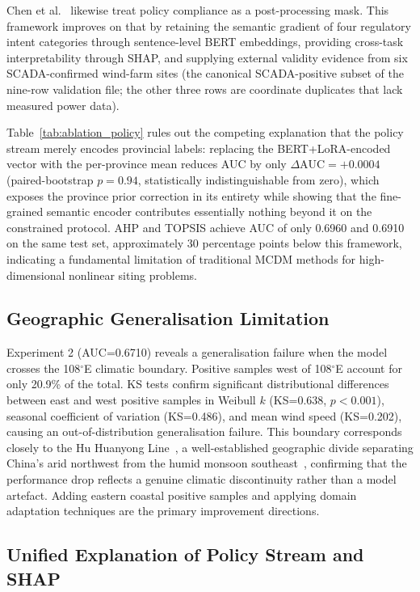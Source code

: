 \documentclass[12pt, a4paper]{article}
\begin{document}
Chen et al.~\cite{chen2026} likewise treat policy compliance
as a post-processing mask. This framework improves on that by
retaining the semantic gradient of four regulatory intent
categories through sentence-level BERT embeddings, providing
cross-task interpretability through SHAP, and supplying
external validity evidence from six SCADA-confirmed wind-farm
sites (the canonical SCADA-positive subset of the nine-row
validation file; the other three rows are coordinate
duplicates that lack measured power data).

Table~\ref{tab:ablation_policy} rules out the competing
explanation that the policy stream merely encodes provincial
labels: replacing the BERT+LoRA-encoded vector with the
per-province mean reduces AUC by only
$\Delta\text{AUC}=+0.0004$ (paired-bootstrap $p=0.94$,
statistically indistinguishable from zero), which exposes the
province prior correction in its entirety while showing that
the fine-grained semantic encoder contributes essentially
nothing beyond it on the constrained protocol. AHP and TOPSIS
achieve AUC of only 0.6960 and 0.6910 on the same test set,
approximately 30 percentage points below this framework,
indicating a fundamental limitation of traditional MCDM
methods for high-dimensional nonlinear siting problems.

\subsection{Geographic Generalisation Limitation}

Experiment 2 (AUC=0.6710) reveals a generalisation failure
when the model crosses the 108$^\circ$E climatic boundary.
Positive samples west of 108$^\circ$E account for only 20.9\%
of the total. KS tests confirm significant distributional
differences between east and west positive samples in Weibull
$k$ (KS=0.638, $p<0.001$), seasonal coefficient of variation
(KS=0.486), and mean wind speed (KS=0.202), causing an
out-of-distribution generalisation failure. This boundary
corresponds closely to the Hu Huanyong Line~\cite{chen2016huline},
a well-established geographic divide separating China's
arid northwest from the humid monsoon southeast~\cite{zhao2023windchina},
confirming that the performance drop reflects a genuine
climatic discontinuity rather than a model artefact. Adding eastern
coastal positive samples and applying domain adaptation
techniques are the primary improvement directions.

\subsection{Unified Explanation of Policy Stream and SHAP}
\label{sec:discussion_unified}
\end{document}
